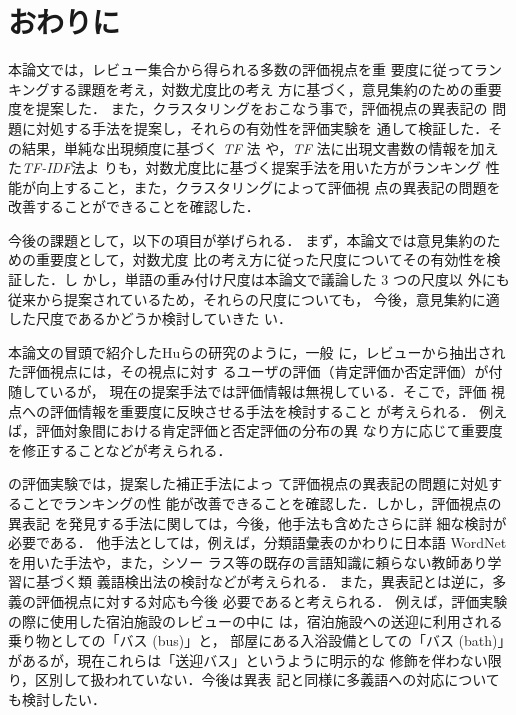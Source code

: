 \documentclass[japanese]{jnlp_1.4}
\def\sec#1{}
\begin{document}
\section{おわりに}
\label{sec:owarini}

本論文では，レビュー集合から得られる多数の評価視点を重
要度に従ってランキングする課題を考え，対数尤度比の考え
方に基づく，意見集約のための重要度を提案した．
また，クラスタリングをおこなう事で，評価視点の異表記の
問題に対処する手法を提案し，それらの有効性を評価実験を
通して検証した．その結果，単純な出現頻度に基づく \textit{TF} 法
や，\textit{TF} 法に出現文書数の情報を加えた\textit{TF-IDF}法よ
りも，対数尤度比に基づく提案手法を用いた方がランキング
性能が向上すること，また，クラスタリングによって評価視
点の異表記の問題を改善することができることを確認した．


今後の課題として，以下の項目が挙げられる．
まず，本論文では意見集約のための重要度として，対数尤度
比の考え方に従った尺度についてその有効性を検証した．し
かし，単語の重み付け尺度は本論文で議論した 3 つの尺度以
外にも従来から提案されているため，それらの尺度についても，
今後，意見集約に適した尺度であるかどうか検討していきた
い．

本論文の冒頭で紹介したHuらの研究\cite{hu}のように，一般
に，レビューから抽出された評価視点には，その視点に対す
るユーザの評価（肯定評価か否定評価）が付随しているが，
現在の提案手法では評価情報は無視している．そこで，評価
視点への評価情報を重要度に反映させる手法を検討すること
が考えられる．
例えば，評価対象間における肯定評価と否定評価の分布の異
なり方に応じて重要度を修正することなどが考えられる．

\sec{experiment}の評価実験では，提案した補正手法によっ
て評価視点の異表記の問題に対処することでランキングの性
能が改善できることを確認した．しかし，評価視点の異表記
を発見する手法に関しては，今後，他手法も含めたさらに詳
細な検討が必要である．
他手法としては，例えば，分類語彙表のかわりに日本語
WordNet\cite{isahara2008a}を用いた手法や，また，シソー
ラス等の既存の言語知識に頼らない教師あり学習に基づく類
義語検出法\cite{mauge2012a}の検討などが考えられる．
また，異表記とは逆に，多義の評価視点に対する対応も今後
必要であると考えられる．
例えば，評価実験の際に使用した宿泊施設のレビューの中に
は，宿泊施設への送迎に利用される乗り物としての「バス (bus)」と，
部屋にある入浴設備としての「バス (bath)」
があるが，現在これらは「送迎バス」というように明示的な
修飾を伴わない限り，区別して扱われていない．今後は異表
記と同様に多義語への対応についても検討したい．



\acknowledgment
\end{document}
